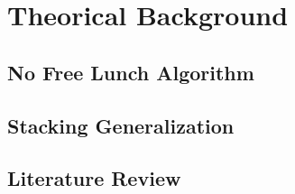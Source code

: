 \chapter{Theorical Background}


\section{No Free Lunch Algorithm}



\section{Stacking Generalization}



\section{Literature Review}

